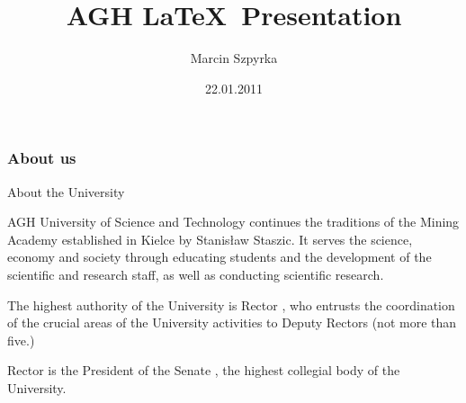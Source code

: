\documentclass{beamer}
\title[AGH presentation]{AGH \LaTeX~Presentation}
\author[M. Szpyrka]{Marcin Szpyrka}
\date[2011]{22.01.2011}
\institute[AGH-UST]
{Faculty of EEACSE\\ 
Department of Automatics
}
\begin{document}
{
 \begin{frame}
   \titlepage
 \end{frame}
}



\begin{frame}
\frametitle{About us}

\begin{block}{About the University}

AGH University of Science and Technology continues the traditions of the Mining Academy established in Kielce by Stanisław Staszic. It serves the science, economy and society through educating students and the development of the scientific and research staff, as well as conducting scientific research.

The highest authority of the University is Rector , who entrusts the coordination of the crucial areas of the University activities to Deputy Rectors (not more than five.)

Rector is the President of the Senate , the highest collegial body of the University. 
\end{block}
\end{frame}

\end{document}
